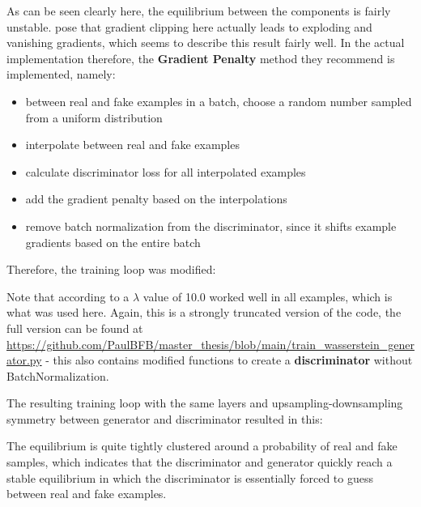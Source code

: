As can be seen clearly here, the equilibrium between the components is fairly unstable.
\cite{gulrajani2017improved} pose that gradient clipping here actually leads to exploding and vanishing gradients, which seems to describe this result fairly well. 
In the actual implementation therefore, the \textbf{Gradient Penalty} method they recommend is implemented, namely:

\begin{itemize}
	\item between real and fake examples in a batch, choose a random number sampled from a uniform distribution
	\item interpolate between real and fake examples
	\item calculate discriminator loss for all interpolated examples
	\item add the gradient penalty based on the interpolations
	\item remove batch normalization from the discriminator, since it shifts example gradients based on the entire batch
\end{itemize}

\pagebreak

Therefore, the training loop was modified:



Note that according to \cite{gulrajani2017improved} a $\lambda$ value of 10.0 worked well in all examples, which is what was used here. Again, this is a strongly truncated version of the code, the full version can be found at \url{https://github.com/PaulBFB/master_thesis/blob/main/train_wasserstein_generator.py} - this also contains modified functions to create a \textbf{discriminator} without BatchNormalization.

The resulting training loop with the same layers and upsampling-downsampling symmetry between generator and discriminator resulted in this:


The equilibrium is quite tightly clustered around a probability of real and fake samples, which indicates that the discriminator and generator quickly reach a stable equilibrium 
in which the discriminator is essentially forced to guess between real and fake examples.

